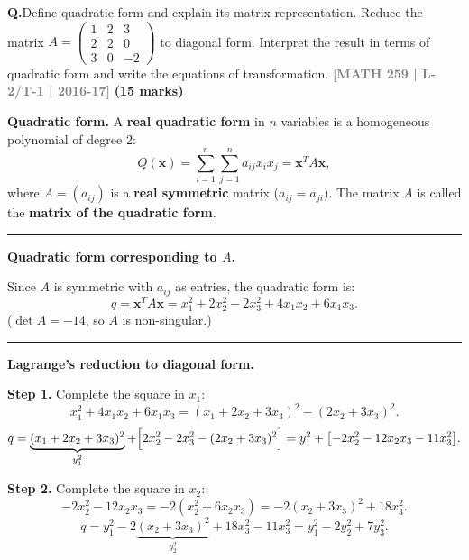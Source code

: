 \documentclass[12pt,a3paper]{article}
\newcommand{\yr}[1]{\hfill\textcolor{gray}{\small\textbf{[#1]}}}
\newcommand{\mk}[1]{\textcolor{orange!70!black}{\small\textbf{(#1 marks)}}}
\newcounter{qnum}
\newcommand{\Q}[1]{%
  \needspace{4\baselineskip}
  \refstepcounter{qnum}
  \vspace{6pt}
  \noindent\textbf{Q\theqnum.}\enspace #1\par
}
\begin{document}
\Q{Define quadratic form and explain its matrix representation. Reduce the matrix $A = \begin{pmatrix} 1 & 2 & 3 \\ 2 & 2 & 0 \\ 3 & 0 & -2 \end{pmatrix}$ to diagonal form. Interpret the result in terms of quadratic form and write the equations of transformation.
\yr{MATH 259 | L-2/T-1 | 2016-17} \mk{15}}

\begin{tcolorbox}[enhanced,breakable,
  colback=cE!4,colframe=cE,boxrule=0.8pt,arc=5pt,
  title={\textbf{Answer --- Quadratic Form Definition \& Diagonal Reduction of
    $A=\begin{pmatrix}1&2&3\\2&2&0\\3&0&-2\end{pmatrix}$}},
  fonttitle=\bfseries\color{white},colbacktitle=cE]

\textbf{Quadratic form.}
A \textbf{real quadratic form} in $n$ variables is a homogeneous polynomial of
degree 2:
\[
  Q(\mathbf{x}) = \sum_{i=1}^{n}\sum_{j=1}^{n} a_{ij} x_i x_j
               = \mathbf{x}^T A \mathbf{x},
\]
where $A = (a_{ij})$ is a \textbf{real symmetric} matrix ($a_{ij} = a_{ji}$).
The matrix $A$ is called the \textbf{matrix of the quadratic form}.

\medskip\textcolor{cE}{\rule{\textwidth}{0.4pt}}

\textbf{Quadratic form corresponding to $A$.}

Since $A$ is symmetric with $a_{ij}$ as entries, the quadratic form is:
\[
  q = \mathbf{x}^T A \mathbf{x}
  = x_1^2 + 2x_2^2 - 2x_3^2 + 4x_1 x_2 + 6x_1 x_3.
\]
($\det A = -14$, so $A$ is non-singular.)

\medskip\textcolor{cE}{\rule{\textwidth}{0.4pt}}

\textbf{Lagrange's reduction to diagonal form.}

\textbf{Step 1.} Complete the square in $x_1$:
\[
  x_1^2 + 4x_1 x_2 + 6x_1 x_3
  = (x_1 + 2x_2 + 3x_3)^2 - (2x_2+3x_3)^2.
\]
\[
  q = \underbrace{(x_1+2x_2+3x_3)^2}_{y_1^2}
    + \Bigl[2x_2^2-2x_3^2-(2x_2+3x_3)^2\Bigr]
  = y_1^2 + \bigl[-2x_2^2 - 12x_2 x_3 - 11x_3^2\bigr].
\]

\textbf{Step 2.} Complete the square in $x_2$:
\[
  -2x_2^2 - 12x_2 x_3
  = -2(x_2^2 + 6x_2 x_3)
  = -2(x_2+3x_3)^2 + 18x_3^2.
\]
\[
  q = y_1^2 - 2\underbrace{(x_2+3x_3)^2}_{y_2^2} + 18x_3^2 - 11x_3^2
  = y_1^2 - 2y_2^2 + 7y_3^2.
\]


\end{tcolorbox}
\end{document}

